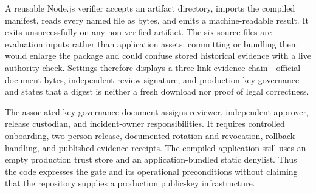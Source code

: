 A reusable Node.js verifier accepts an artifact directory, imports the compiled manifest, reads every named file as bytes, and emits a machine-readable result. It exits unsuccessfully on any non-verified artifact. The six source files are evaluation inputs rather than application assets: committing or bundling them would enlarge the package and could confuse stored historical evidence with a live authority check. Settings therefore displays a three-link evidence chain---official document bytes, independent review signature, and production key governance---and states that a digest is neither a fresh download nor proof of legal correctness.

The associated key-governance document assigns reviewer, independent approver, release custodian, and incident-owner responsibilities. It requires controlled onboarding, two-person release, documented rotation and revocation, rollback handling, and published evidence receipts. The compiled application still uses an empty production trust store and an application-bundled static denylist. Thus the code expresses the gate and its operational preconditions without claiming that the repository supplies a production public-key infrastructure.
